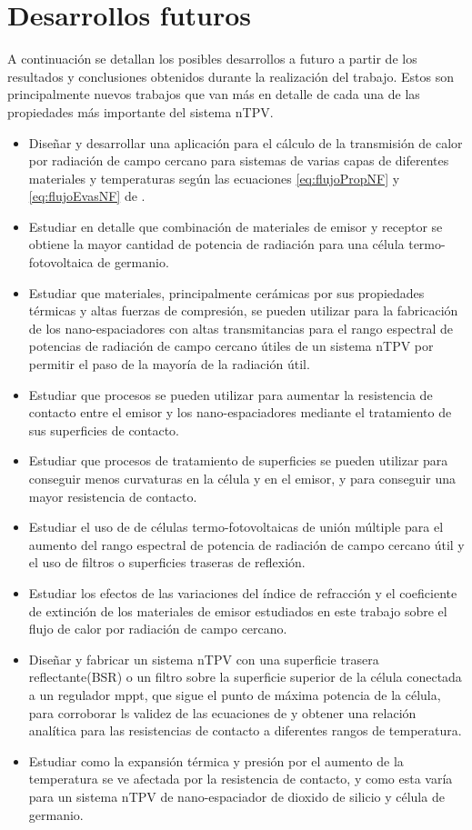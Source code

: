 \section{Desarrollos futuros}
A continuación se detallan los posibles desarrollos a futuro a partir de los resultados y conclusiones obtenidos durante la realización del trabajo. Estos son principalmente nuevos trabajos que van más en detalle de cada una de las propiedades más importante del sistema nTPV.
\begin{itemize}
	\item Diseñar y desarrollar una aplicación para el cálculo de la transmisión de calor por radiación de campo cercano para sistemas de varias capas de diferentes materiales y temperaturas según las ecuaciones \eqref{eq:flujoPropNF} y \eqref{eq:flujoEvasNF} de \cite{nfTPV_fullEquations}.
	\item Estudiar en detalle que combinación de materiales de emisor y receptor se obtiene la mayor cantidad de potencia de radiación para una célula termo-fotovoltaica de germanio.
	\item Estudiar que materiales, principalmente cerámicas por sus propiedades térmicas y altas fuerzas de compresión, se pueden utilizar para la fabricación de los nano-espaciadores con altas transmitancias para el rango espectral de potencias de radiación de campo cercano útiles de un sistema nTPV por permitir el paso de la mayoría de la radiación útil.
	\item Estudiar que procesos se pueden utilizar para aumentar la resistencia de contacto entre el emisor y los nano-espaciadores mediante el tratamiento de sus superficies de contacto.
	\item Estudiar que procesos de tratamiento de superficies se pueden utilizar para conseguir menos curvaturas en la célula y en el emisor, y para conseguir una mayor resistencia de contacto.
	\item Estudiar el uso de de células termo-fotovoltaicas de unión múltiple para el aumento del rango espectral de potencia de radiación de campo cercano útil y el uso de filtros o superficies traseras de reflexión.
	\item Estudiar los efectos de las variaciones del índice de refracción y el coeficiente de extinción de los materiales de emisor estudiados en este trabajo sobre el flujo de calor por radiación de campo cercano.
	\item Diseñar y fabricar un sistema nTPV con una superficie trasera reflectante(BSR) o un filtro sobre la superficie superior de la célula conectada a un regulador mppt, que sigue el punto de máxima potencia de la célula, para corroborar ls validez de las ecuaciones de \cite{nfTPV_fullEquations} y obtener una relación analítica para las resistencias de contacto a diferentes rangos de temperatura.
	\item Estudiar como la expansión térmica y presión por el aumento de la temperatura se ve afectada por la resistencia de contacto, y como esta varía para un sistema nTPV de nano-espaciador de dioxido de silicio y célula de germanio.
\end{itemize}
